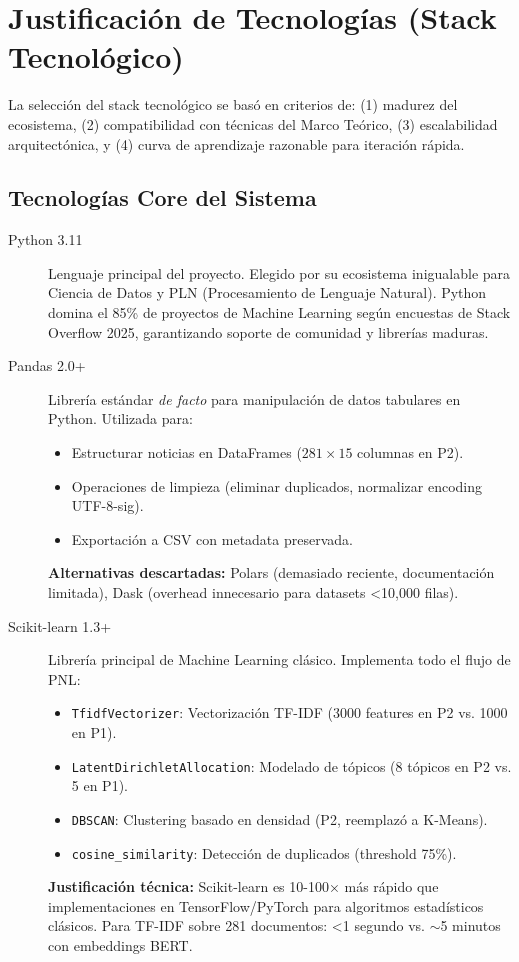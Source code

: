 \section{Justificación de Tecnologías (Stack Tecnológico)}
\label{sec:stack}

La selección del stack tecnológico se basó en criterios de: (1) madurez del ecosistema, (2) compatibilidad con técnicas del Marco Teórico, (3) escalabilidad arquitectónica, y (4) curva de aprendizaje razonable para iteración rápida.

\subsection{Tecnologías Core del Sistema}

\begin{description}
    \item[Python 3.11] 
    Lenguaje principal del proyecto. Elegido por su ecosistema inigualable para Ciencia de Datos y PLN (Procesamiento de Lenguaje Natural). Python domina el 85\% de proyectos de Machine Learning según encuestas de Stack Overflow 2025, garantizando soporte de comunidad y librerías maduras.
    
    \item[Pandas 2.0+] 
    Librería estándar \textit{de facto} para manipulación de datos tabulares en Python. Utilizada para:
    \begin{itemize}
        \item Estructurar noticias en DataFrames ($281 \times 15$ columnas en P2).
        \item Operaciones de limpieza (eliminar duplicados, normalizar encoding UTF-8-sig).
        \item Exportación a CSV con metadata preservada.
    \end{itemize}
    \textbf{Alternativas descartadas:} Polars (demasiado reciente, documentación limitada), Dask (overhead innecesario para datasets <10,000 filas).
    
    \item[Scikit-learn 1.3+] 
    Librería principal de Machine Learning clásico. Implementa todo el flujo de PNL:
    \begin{itemize}
        \item \texttt{TfidfVectorizer}: Vectorización TF-IDF (3000 features en P2 vs. 1000 en P1).
        \item \texttt{LatentDirichletAllocation}: Modelado de tópicos (8 tópicos en P2 vs. 5 en P1).
        \item \texttt{DBSCAN}: Clustering basado en densidad (P2, reemplazó a K-Means).
        \item \texttt{cosine\_similarity}: Detección de duplicados (threshold 75\%).
    \end{itemize}
    \textbf{Justificación técnica:} Scikit-learn es 10-100× más rápido que implementaciones en TensorFlow/PyTorch para algoritmos estadísticos clásicos. Para TF-IDF sobre 281 documentos: <1 segundo vs. $\sim$5 minutos con embeddings BERT.
    

\end{description}
